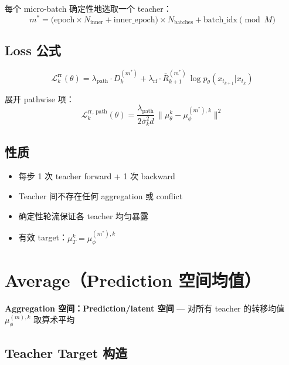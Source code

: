 \documentclass[11pt,a4paper]{article}
\newcommand{\loss}{\mathcal{L}}
\newcommand{\mutheta}{\mu_\theta}
\newcommand{\muphi}{\mu_\phi}
\newcommand{\sigbar}{\bar{\sigma}}
\newcommand{\Rbar}{\bar{R}}
\newcommand{\lpath}{\lambda_{\mathrm{path}}}
\newcommand{\lrf}{\lambda_{\mathrm{rf}}}
\theoremstyle{definition}
\begin{document}
每个 micro-batch 确定性地选取一个 teacher：
\begin{equation}
m^* = \bigl(\text{epoch} \times N_{\mathrm{inner}} + \text{inner\_epoch}\bigr) \times N_{\mathrm{batches}} + \text{batch\_idx} \pmod{M}
\end{equation}

\subsection{Loss 公式}

\begin{equation}
\boxed{
\loss_k^{\mathrm{rr}}(\theta) = \lpath \cdot D_k^{(m^*)}
+ \lrf \cdot \Rbar_{k+1}^{(m^*)}\,\log p_\theta(x_{t_{k+1}}|x_{t_k})
}
\label{eq:loss_rr}
\end{equation}

展开 pathwise 项：
\begin{equation}
\loss_k^{\mathrm{rr,\,path}}(\theta) = \frac{\lpath}{2\sigbar_k^2 d}\,\|\mutheta^k - \muphi^{(m^*),k}\|^2
\end{equation}

\subsection{性质}

\begin{itemize}[leftmargin=1.5em]
\item 每步 1 次 teacher forward + 1 次 backward
\item Teacher 间不存在任何 aggregation 或 conflict
\item 确定性轮流保证各 teacher 均匀暴露
\item 有效 target：$\mu_T^k = \muphi^{(m^*),k}$
\end{itemize}

\section{Average（Prediction 空间均值）}
\label{sec:average}

\begin{tcolorbox}[colback=green!5, colframe=green!50]
\textbf{Aggregation 空间：Prediction/latent 空间} — 对所有 teacher 的转移均值 $\muphi^{(m),k}$ 取算术平均
\end{tcolorbox}

\subsection{Teacher Target 构造}
\end{document}
